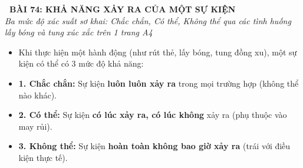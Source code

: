 \documentclass[11pt,a4paper]{article}
\begin{document}
\begin{tcolorbox}[
  enhanced,
  colback=white,
  colframe=primary,
  arc=3mm,
  boxrule=1.2pt,
  left=4mm, right=4mm, top=2.5mm, bottom=2.5mm,
  drop shadow=black!10!white
]
  \centering
  {\Large\bfseries\color{primary}\faBookmark\ BÀI 74: KHẢ NĂNG XẢY RA CỦA MỘT SỰ KIỆN}\\[1.5mm]
  {\small\itshape\color{black!75}Ba mức độ xác suất sơ khai: Chắc chắn, Có thể, Không thể qua các tình huống lấy bóng và tung xúc xắc trên 1 trang A4}
\end{tcolorbox}

\vspace{-2mm}


\noindent
\begin{minipage}[t]{0.49\textwidth}\vspace{0pt}
\begin{tcolorbox}[
  enhanced,
  colback=blue!4!white,
  colframe=blue!75!black,
  arc=2mm, boxrule=0.8pt,
  left=2mm, right=2mm, top=1.8mm, bottom=1.8mm,
  title={\footnotesize\bfseries\color{white}\faKey\ 1. Ba mức độ khả năng của sự kiện}
]
{\footnotesize
\begin{itemize}\setlength{\itemsep}{1.5pt}\setlength{\leftskip}{-2.5mm}
  \item Khi thực hiện một hành động (như rút thẻ, lấy bóng, tung đồng xu), một sự kiện có thể có $3$ mức độ khả năng:
  \item \textbf{1. Chắc chắn:} Sự kiện \textbf{luôn luôn xảy ra} trong mọi trường hợp (không thể nào khác).
  \item \textbf{2. Có thể:} Sự kiện \textbf{có lúc xảy ra, có lúc không} xảy ra (phụ thuộc vào may rủi).
  \item \textbf{3. Không thể:} Sự kiện \textbf{hoàn toàn không bao giờ xảy ra} (trái với điều kiện thực tế).
\end{itemize}
}
\end{tcolorbox}
\end{minipage}
\hfill
\end{document}
